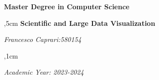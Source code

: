 \begin{titlepage}
    
    \centering

    \vskip 5cm
        \begin{Large}
            {
            \bf Master Degree in Computer Science
            }
            \\
        \end{Large}
    
    ,5cm
    {\Huge\bfseries Scientific and Large Data Visualization}
    \vskip 10cm
        \begin{Large}
        \vskip 0.3cm
        \textit{Francesco Caprari:580154}
        \end{Large}
    ,1cm
    
    \begin{Large}
        \textit{Academic Year: 2023-2024}
    \end{Large}
    
\end{titlepage}